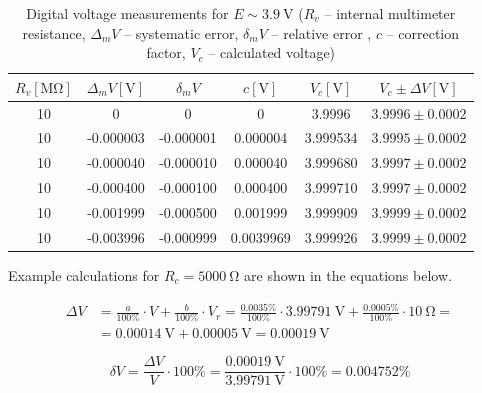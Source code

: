 \begin{table}[H]
	\centering
	\begin{tabular}{  c | c | c | c | c | c}
		 $R_v [\unit{\mega\ohm}]$ & $\Delta_m V [\unit{\volt}]$ & $\delta_m V$ & $c [\unit{\volt}]$ & $V_c [\unit{\volt}]$ & $V_c \pm \Delta V [\unit{\volt}]$\\
		\hline
		10 & 0 & 0 & 0 & 3.9996 & $3.9996 \pm 0.0002$\\
		\hline
		10 & -0.000003 & -0.000001 & 0.000004 & 3.999534 & $3.9995 \pm 0.0002$\\
		\hline
		10 & -0.000040 & -0.000010 & 0.000040 & 3.999680 & $3.9997 \pm 0.0002$\\
		\hline
		10 & -0.000400 & -0.000100 & 0.000400 & 3.999710 & $3.9997 \pm 0.0002$\\
		\hline
		10 & -0.001999 & -0.000500 & 0.001999 & 3.999909 &$ 3.9999 \pm 0.0002$\\
		\hline
		10 & -0.003996 & -0.000999& 0.0039969 & 3.999926 & $3.9999 \pm 0.0002$\\
	\end{tabular}
	\caption{Digital voltage measurements for $E \sim \SI{3.9}{\volt}$ ($R_v$ -- internal multimeter resistance, $\Delta_m V$ -- systematic error, $\delta_m V$ -- relative error
		, $c$ -- correction factor, $V_c$ -- calculated voltage)}
	\label{tab:digital_voltage_2}
\end{table}

Example calculations for $R_c = \SI{5000}{\ohm}$ are shown in the equations below. %

\begin{equation}
	\begin{split}
		\Delta V &= \frac{a}{100\unit{\percent}}\cdot V + 	\frac{b}{100\unit{\percent}}\cdot V_r = \frac{0.0035\unit{\percent}}{100\unit{\percent}}\cdot\SI{3.99791}{\volt} + \frac{0.0005\unit{\percent}}{100\unit{\percent}}\cdot\SI{10}{\ohm} =\\
		&= \SI{0.00014}{\volt} + \SI{0.00005}{\volt} = \SI{0.00019}{\volt}
	\end{split}
	\label{eq:digital_Delta_V}
\end{equation}

\begin{equation}
	\delta V = \frac{\Delta V}{V}\cdot 100\unit{\percent} = \frac{\SI{0.00019}{\volt}}{\SI{3.99791}{\volt}}\cdot 100\unit{\percent} = 0.004752\unit{\percent}
	\label{eq:digital_delta_V}
\end{equation}

